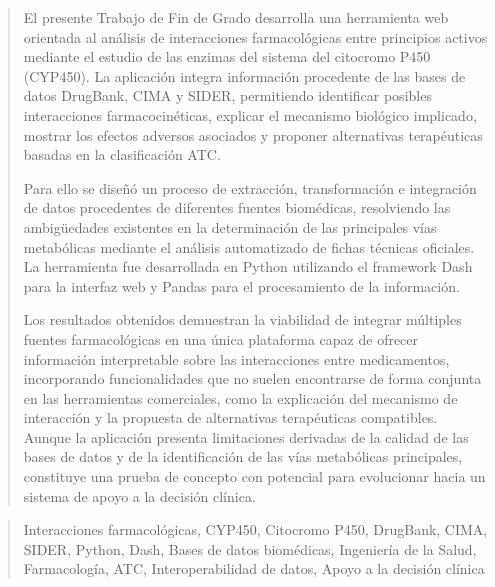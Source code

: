 \documentclass[a4paper,12pt,twoside]{memoir}
\begin{document}
\newpage\null\thispagestyle{empty}\newpage




\frontmatter

\renewcommand*\abstractname{Resumen}
\begin{abstract}
El presente Trabajo de Fin de Grado desarrolla una herramienta web orientada al análisis de interacciones farmacológicas entre principios activos mediante el estudio de las enzimas del sistema del citocromo P450 (CYP450). La aplicación integra información procedente de las bases de datos DrugBank, CIMA y SIDER, permitiendo identificar posibles interacciones farmacocinéticas, explicar el mecanismo biológico implicado, mostrar los efectos adversos asociados y proponer alternativas terapéuticas basadas en la clasificación ATC.

Para ello se diseñó un proceso de extracción, transformación e integración de datos procedentes de diferentes fuentes biomédicas, resolviendo las ambigüedades existentes en la determinación de las principales vías metabólicas mediante el análisis automatizado de fichas técnicas oficiales. La herramienta fue desarrollada en Python utilizando el framework Dash para la interfaz web y Pandas para el procesamiento de la información.

Los resultados obtenidos demuestran la viabilidad de integrar múltiples fuentes farmacológicas en una única plataforma capaz de ofrecer información interpretable sobre las interacciones entre medicamentos, incorporando funcionalidades que no suelen encontrarse de forma conjunta en las herramientas comerciales, como la explicación del mecanismo de interacción y la propuesta de alternativas terapéuticas compatibles. Aunque la aplicación presenta limitaciones derivadas de la calidad de las bases de datos y de la identificación de las vías metabólicas principales, constituye una prueba de concepto con potencial para evolucionar hacia un sistema de apoyo a la decisión clínica.
\end{abstract}

\renewcommand*\abstractname{Descriptores}
\begin{abstract}
Interacciones farmacológicas, CYP450, Citocromo P450, DrugBank, CIMA, SIDER, Python, Dash, Bases de datos biomédicas, Ingeniería de la Salud, Farmacología, ATC, Interoperabilidad de datos, Apoyo a la decisión clínica
\end{abstract}

\clearpage
\end{document}
